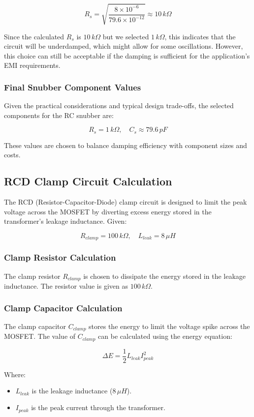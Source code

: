 \documentclass{article}
\begin{document}
\[
R_s = \sqrt{\frac{8 \times 10^{-6}}{79.6 \times 10^{-12}}} \approx 10 \, k\Omega
\]

Since the calculated \( R_s \) is \( 10 \, k\Omega \) but we selected \( 1 \, k\Omega \), this indicates that the circuit will be underdamped, which might allow for some oscillations. However, this choice can still be acceptable if the damping is sufficient for the application's EMI requirements.

\subsubsection{Final Snubber Component Values}
Given the practical considerations and typical design trade-offs, the selected components for the RC snubber are:

\[
R_s = 1 \, k\Omega, \quad C_s \approx 79.6 \, pF
\]

These values are chosen to balance damping efficiency with component sizes and costs.

\subsection{RCD Clamp Circuit Calculation}
The RCD (Resistor-Capacitor-Diode) clamp circuit is designed to limit the peak voltage across the MOSFET by diverting excess energy stored in the transformer's leakage inductance. Given:

\[
R_{clamp} = 100 \, k\Omega, \quad L_{leak} = 8 \, \mu H
\]

\subsubsection{Clamp Resistor Calculation}
The clamp resistor \( R_{clamp} \) is chosen to dissipate the energy stored in the leakage inductance. The resistor value is given as \( 100 \, k\Omega \).

\subsubsection{Clamp Capacitor Calculation}
The clamp capacitor \( C_{clamp} \) stores the energy to limit the voltage spike across the MOSFET. The value of \( C_{clamp} \) can be calculated using the energy equation:

\[
\Delta E = \frac{1}{2} L_{leak} I_{peak}^2
\]

Where:
\begin{itemize}
    \item \( L_{leak} \) is the leakage inductance (\( 8 \, \mu H \)).
    \item \( I_{peak} \) is the peak current through the transformer.
\end{itemize}
\end{document}
